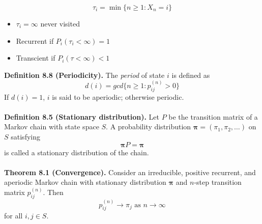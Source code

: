 \documentclass[12pt,a4paper]{report}
\begin{document}
\begin{equation}
\tau_i=\min\{n\geq1:X_n=i\}
\end{equation}
\begin{itemize}
\setlength\itemsep{0em}
\item[] $\tau_i=\infty$ never visited
\item[] Recurrent if $P_i(\tau_i<\infty)=1$
\item[] Transcient if $P_i(\tau<\infty)<1$
\end{itemize}
\textbf{Definition 8.8 (Periodicity).} The \textit{period} of state $i$ is defined as
\begin{equation}
d(i)=gcd\{n\geq1:p_{ij}^{(n)}>0\}
\end{equation}
If $d(i)=1$, $i$ is said to be aperiodic; otherwise periodic.\\\\
\textbf{Definition 8.5 (Stationary distribution).} Let $P$ be the transition matrix of a Markov chain with state space $S$. A probability distribution $\mathbf{\pi}=(\pi_1,\pi_2,\ldots)$ on $S$ satisfying
\begin{equation}
\mathbf{\pi}P=\mathbf{\pi}
\end{equation}
is called a stationary distribution of the chain.\\\\
\textbf{Theorem 8.1 (Convergence).} Consider an irreducible, positive recurrent, and aperiodic Markov chain with stationary distribution $\mathbf{\pi}$ and $n$-step transition matrix $p_{ij}^{(n)}$. Then
\begin{equation}
p_{ij}^{(n)}\to\pi_j\text{ as }n\to\infty
\end{equation}
for all $i,j\in S$.
\end{document}
